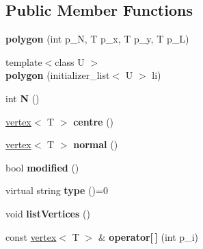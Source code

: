 \subsection*{Public Member Functions}
\begin{DoxyCompactItemize}
\item 
\hypertarget{classpolygons_1_1polygon_a15af5594d92579ffd4ae2fb51edc3de7}{{\bfseries polygon} (int p\-\_\-\-N, T p\-\_\-x, T p\-\_\-y, T p\-\_\-\-L)}\label{classpolygons_1_1polygon_a15af5594d92579ffd4ae2fb51edc3de7}

\item 
\hypertarget{classpolygons_1_1polygon_a93e192db67d4b8a841066c09838d377a}{{\footnotesize template$<$class U $>$ }\\{\bfseries polygon} (initializer\-\_\-list$<$ U $>$ li)}\label{classpolygons_1_1polygon_a93e192db67d4b8a841066c09838d377a}

\item 
\hypertarget{classpolygons_1_1polygon_a89546d086da3c7b779f3cfac3e17ca47}{int {\bfseries N} ()}\label{classpolygons_1_1polygon_a89546d086da3c7b779f3cfac3e17ca47}

\item 
\hypertarget{classpolygons_1_1polygon_afac16ab826161151ec6c72d76b30963d}{\hyperlink{classpolygons_1_1vertex}{vertex}$<$ T $>$ {\bfseries centre} ()}\label{classpolygons_1_1polygon_afac16ab826161151ec6c72d76b30963d}

\item 
\hypertarget{classpolygons_1_1polygon_a25500df92a688cf99f061bbef709ad14}{\hyperlink{classpolygons_1_1vertex}{vertex}$<$ T $>$ {\bfseries normal} ()}\label{classpolygons_1_1polygon_a25500df92a688cf99f061bbef709ad14}

\item 
\hypertarget{classpolygons_1_1polygon_af26febef898801a19a9d6ddbbde4e4cf}{bool {\bfseries modified} ()}\label{classpolygons_1_1polygon_af26febef898801a19a9d6ddbbde4e4cf}

\item 
\hypertarget{classpolygons_1_1polygon_a3291384abefa6279f035f412f9d0dec3}{virtual string {\bfseries type} ()=0}\label{classpolygons_1_1polygon_a3291384abefa6279f035f412f9d0dec3}

\item 
\hypertarget{classpolygons_1_1polygon_aef5db913d4250fbda4cc40184858c4c1}{void {\bfseries list\-Vertices} ()}\label{classpolygons_1_1polygon_aef5db913d4250fbda4cc40184858c4c1}

\item 
\hypertarget{classpolygons_1_1polygon_a513f206b17fd9a8409e07b4c4a93ce51}{const \hyperlink{classpolygons_1_1vertex}{vertex}$<$ T $>$ \& {\bfseries operator\mbox{[}$\,$\mbox{]}} (int p\-\_\-i)}\label{classpolygons_1_1polygon_a513f206b17fd9a8409e07b4c4a93ce51}


\end{DoxyCompactItemize}

